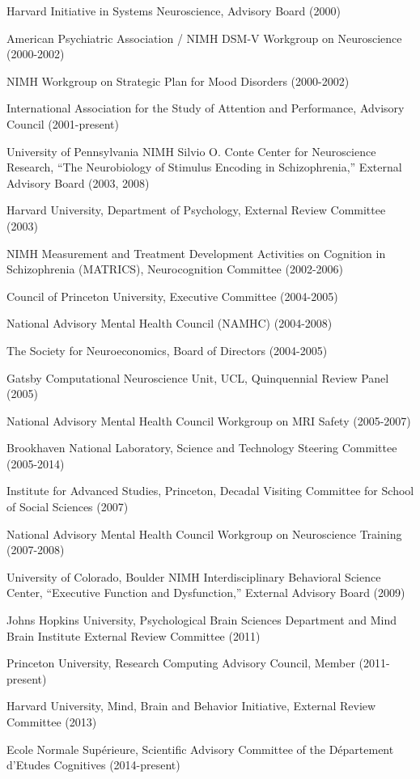 \documentclass[10 pt]{article}
\begin{document}
Harvard Initiative in Systems Neuroscience, Advisory Board (2000)

American Psychiatric Association / NIMH DSM-V Workgroup on Neuroscience (2000-2002)

NIMH Workgroup on Strategic Plan for Mood Disorders (2000-2002)

International Association for the Study of Attention and Performance, Advisory Council (2001-present)

University of Pennsylvania NIMH Silvio O. Conte Center for Neuroscience Research, “The Neurobiology of Stimulus Encoding in Schizophrenia,” External Advisory Board (2003, 2008)

Harvard University, Department of Psychology, External Review Committee (2003)

NIMH Measurement and Treatment Development Activities on Cognition in Schizophrenia (MATRICS), Neurocognition Committee (2002-2006)

Council of Princeton University, Executive Committee (2004-2005)

National Advisory Mental Health Council (NAMHC) (2004-2008)

The Society for Neuroeconomics, Board of Directors (2004-2005)

Gatsby Computational Neuroscience Unit, UCL, Quinquennial Review Panel (2005)

National Advisory Mental Health Council Workgroup on MRI Safety (2005-2007)

Brookhaven National Laboratory, Science and Technology Steering Committee (2005-2014)

Institute for Advanced Studies, Princeton, Decadal Visiting Committee for School of Social Sciences (2007)

National Advisory Mental Health Council Workgroup on Neuroscience Training (2007-2008)

University of Colorado, Boulder NIMH Interdisciplinary Behavioral Science Center, “Executive Function and Dysfunction,” External Advisory Board (2009)

Johns Hopkins University, Psychological Brain Sciences Department and Mind Brain Institute External Review Committee (2011)

Princeton University, Research Computing Advisory Council, Member (2011-present)

Harvard University, Mind, Brain and Behavior Initiative, External Review Committee (2013)

Ecole Normale Supérieure, Scientific Advisory Committee of the Département d'Etudes Cognitives (2014-present)
\end{document}
